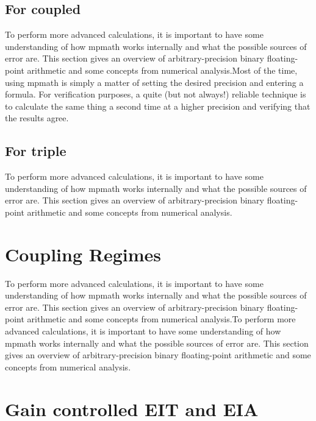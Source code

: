\subsection{For coupled}
To perform more advanced calculations, it is important to have some understanding of how mpmath works internally and what the possible sources of error are. This section gives an overview of arbitrary-precision binary floating-point arithmetic and some concepts from numerical analysis.Most of the time, using mpmath is simply a matter of setting the desired precision and entering a formula. For verification purposes, a quite (but not always!) reliable technique is to calculate the same thing a second time at a higher precision and verifying that the results agree.
\subsection{For triple}
To perform more advanced calculations, it is important to have some understanding of how mpmath works internally and what the possible sources of error are. This section gives an overview of arbitrary-precision binary floating-point arithmetic and some concepts from numerical analysis.

\section{Coupling Regimes}
To perform more advanced calculations, it is important to have some understanding of how mpmath works internally and what the possible sources of error are. This section gives an overview of arbitrary-precision binary floating-point arithmetic and some concepts from numerical analysis.To perform more advanced calculations, it is important to have some understanding of how mpmath works internally and what the possible sources of error are. This section gives an overview of arbitrary-precision binary floating-point arithmetic and some concepts from numerical analysis.

\section{Gain controlled EIT and EIA}